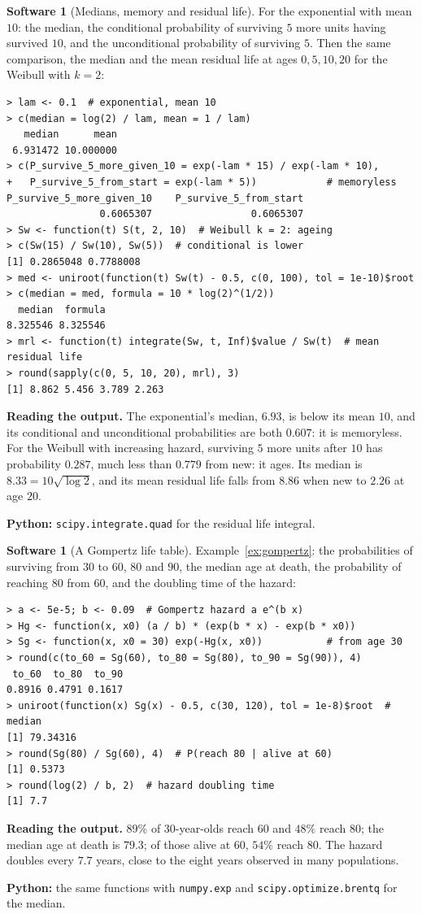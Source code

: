 \documentclass[11pt,a4paper]{article}
\numberwithin{equation}{section}
\theoremstyle{definition}
\newtheorem{software}[thm]{Software}
\begin{document}
\begin{software}[Medians, memory and residual life]
\label{sw:memory}
For the exponential with mean $10$: the median, the conditional probability of surviving $5$ more units having survived $10$, and the unconditional probability of surviving $5$. Then the same comparison, the median and the mean residual life at ages $0, 5, 10, 20$ for the Weibull with $k = 2$:
{\small\begin{verbatim}
> lam <- 0.1  # exponential, mean 10
> c(median = log(2) / lam, mean = 1 / lam)
   median      mean 
 6.931472 10.000000 
> c(P_survive_5_more_given_10 = exp(-lam * 15) / exp(-lam * 10),
+   P_survive_5_from_start = exp(-lam * 5))            # memoryless
P_survive_5_more_given_10    P_survive_5_from_start 
                0.6065307                 0.6065307 
> Sw <- function(t) S(t, 2, 10)  # Weibull k = 2: ageing
> c(Sw(15) / Sw(10), Sw(5))  # conditional is lower
[1] 0.2865048 0.7788008
> med <- uniroot(function(t) Sw(t) - 0.5, c(0, 100), tol = 1e-10)$root
> c(median = med, formula = 10 * log(2)^(1/2))
  median  formula 
8.325546 8.325546 
> mrl <- function(t) integrate(Sw, t, Inf)$value / Sw(t)  # mean residual life
> round(sapply(c(0, 5, 10, 20), mrl), 3)
[1] 8.862 5.456 3.789 2.263
\end{verbatim}}
\textbf{Reading the output.} The exponential's median, $6.93$, is below its mean $10$, and its conditional and unconditional probabilities are both $0.607$: it is memoryless. For the Weibull with increasing hazard, surviving $5$ more units after $10$ has probability $0.287$, much less than $0.779$ from new: it ages. Its median is $8.33 = 10\sqrt{\log 2}$, and its mean
residual life falls from $8.86$ when new to $2.26$ at age $20$.

\textbf{Python:} \texttt{scipy.integrate.quad} for the residual life integral.
\end{software}

\begin{software}[A Gompertz life table]
\label{sw:gompertz}
Example~\ref{ex:gompertz}: the probabilities of surviving from $30$ to $60$, $80$ and $90$, the median age at death, the probability of reaching $80$ from $60$, and the doubling time of the hazard:
{\small\begin{verbatim}
> a <- 5e-5; b <- 0.09  # Gompertz hazard a e^(b x)
> Hg <- function(x, x0) (a / b) * (exp(b * x) - exp(b * x0))
> Sg <- function(x, x0 = 30) exp(-Hg(x, x0))           # from age 30
> round(c(to_60 = Sg(60), to_80 = Sg(80), to_90 = Sg(90)), 4)
 to_60  to_80  to_90 
0.8916 0.4791 0.1617 
> uniroot(function(x) Sg(x) - 0.5, c(30, 120), tol = 1e-8)$root  # median
[1] 79.34316
> round(Sg(80) / Sg(60), 4)  # P(reach 80 | alive at 60)
[1] 0.5373
> round(log(2) / b, 2)  # hazard doubling time
[1] 7.7
\end{verbatim}}
\textbf{Reading the output.} $89\%$ of $30$-year-olds reach $60$ and $48\%$ reach $80$; the median age at death is $79.3$; of those alive at $60$, $54\%$ reach $80$. The hazard doubles every $7.7$ years, close to the eight years observed in many populations.

\textbf{Python:} the same functions with \texttt{numpy.exp} and \texttt{scipy.optimize.brentq} for the median.
\end{software}
\end{document}
